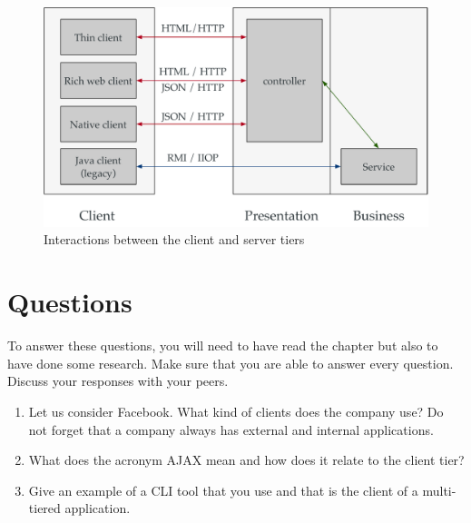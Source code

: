\begin{figure}[]
	\centering
    \includegraphics[width=1.0\linewidth]{Figures/client-tier.pdf}
	\caption{Interactions between the client and server tiers}
  \label{fig:client-tier}
\end{figure}

\section{Questions}

To answer these questions, you will need to have read the chapter but also to have done some research. Make sure that you are able to answer every question. Discuss your responses with your peers.

\begin{enumerate}
\item Let us consider Facebook. What kind of clients does the company use? Do not forget that a company always has external and internal applications.
\item What does the acronym AJAX mean and how does it relate to the client tier?
\item Give an example of a \ac{CLI} tool that you use and that is the client of a multi-tiered application.
\end{enumerate}

